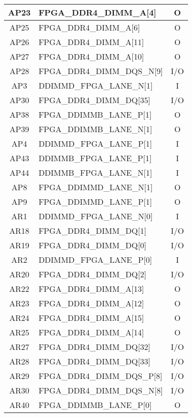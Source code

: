 \begin{longtable}[l]{| c | l | c |}
  AP23 & FPGA\_DDR4\_DIMM\_A[4]       & O   \\ \hline
  AP25 & FPGA\_DDR4\_DIMM\_A[6]       & O   \\ \hline
  AP26 & FPGA\_DDR4\_DIMM\_A[11]      & O   \\ \hline
  AP27 & FPGA\_DDR4\_DIMM\_A[10]      & O   \\ \hline
  AP28 & FPGA\_DDR4\_DIMM\_DQS\_N[9]  & I/O \\ \hline
  AP3  & DDIMMD\_FPGA\_LANE\_N[1]     & I   \\ \hline
  AP30 & FPGA\_DDR4\_DIMM\_DQ[35]     & I/O \\ \hline
  AP38 & FPGA\_DDIMMB\_LANE\_P[1]     & O   \\ \hline
  AP39 & FPGA\_DDIMMB\_LANE\_N[1]     & O   \\ \hline
  AP4  & DDIMMD\_FPGA\_LANE\_P[1]     & I   \\ \hline
  AP43 & DDIMMB\_FPGA\_LANE\_P[1]     & I   \\ \hline
  AP44 & DDIMMB\_FPGA\_LANE\_N[1]     & I   \\ \hline
  AP8  & FPGA\_DDIMMD\_LANE\_N[1]     & O   \\ \hline
  AP9  & FPGA\_DDIMMD\_LANE\_P[1]     & O   \\ \hline
  AR1  & DDIMMD\_FPGA\_LANE\_N[0]     & I   \\ \hline
  AR18 & FPGA\_DDR4\_DIMM\_DQ[1]      & I/O \\ \hline
  AR19 & FPGA\_DDR4\_DIMM\_DQ[0]      & I/O \\ \hline
  AR2  & DDIMMD\_FPGA\_LANE\_P[0]     & I   \\ \hline
  AR20 & FPGA\_DDR4\_DIMM\_DQ[2]      & I/O \\ \hline
  AR22 & FPGA\_DDR4\_DIMM\_A[13]      & O   \\ \hline
  AR23 & FPGA\_DDR4\_DIMM\_A[12]      & O   \\ \hline
  AR24 & FPGA\_DDR4\_DIMM\_A[15]      & O   \\ \hline
  AR25 & FPGA\_DDR4\_DIMM\_A[14]      & O   \\ \hline
  AR27 & FPGA\_DDR4\_DIMM\_DQ[32]     & I/O \\ \hline
  AR28 & FPGA\_DDR4\_DIMM\_DQ[33]     & I/O \\ \hline
  AR29 & FPGA\_DDR4\_DIMM\_DQS\_P[8]  & I/O \\ \hline
  AR30 & FPGA\_DDR4\_DIMM\_DQS\_N[8]  & I/O \\ \hline
  AR40 & FPGA\_DDIMMB\_LANE\_P[0]     & O   \\ \hline

\end{longtable}
